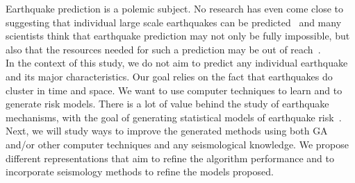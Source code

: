 Earthquake prediction is a polemic subject. No research has even come close to suggesting that individual large scale earthquakes can be predicted~\cite{ecta14} and many scientists think that earthquake prediction may not only be fully impossible, but also that the resources needed for such a prediction may be out of reach~\cite{eberhard2014multiscale}.\\

In the context of this study, we do not aim to predict any individual earthquake and its major characteristics. Our goal relies on the fact that earthquakes do cluster in time and space. We want to use computer techniques to learn and to generate risk models. There is a lot of value behind the study of earthquake mechanisms, with the goal of generating statistical models of earthquake risk~\cite{Nature1999}.\\

Next, we will study ways to improve the generated methods using both GA and/or other computer techniques and any seismological knowledge. We propose different representations that aim to refine the algorithm performance and to incorporate seismology methods to refine the models proposed.\\

%
%
%
%
%
%
%
%
